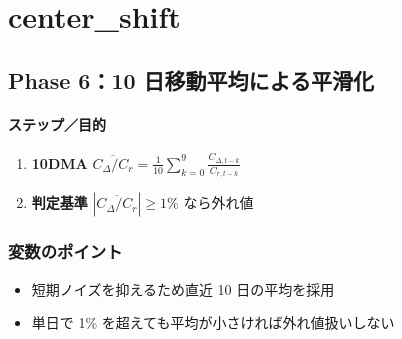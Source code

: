 
\section*{center\_shift}\nopagebreak[4]

\subsection*{Phase 6：10 日移動平均による平滑化}\nopagebreak[4]
\paragraph{ステップ／目的}
\begin{flushleft}
\begin{enumerate}
  \item \textbf{10DMA}\; \( \overline{C_{\Delta}/C_r} = \frac{1}{10}\sum_{k=0}^{9} \frac{C_{\Delta,t-k}}{C_{r,t-k}} \)
  \item \textbf{判定基準}\; \( \left|\overline{C_{\Delta}/C_r}\right| \ge 1\% \) なら外れ値
\end{enumerate}
\end{flushleft}

\subsubsection*{変数のポイント}
\begin{flushleft}
\begin{itemize}
  \item 短期ノイズを抑えるため直近 10 日の平均を採用
  \item 単日で 1\% を超えても平均が小さければ外れ値扱いしない
\end{itemize}
\end{flushleft}


